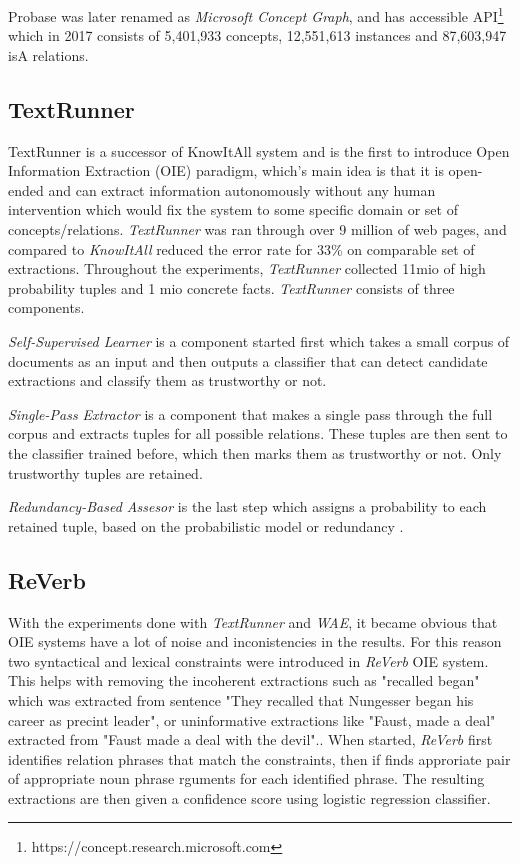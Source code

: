 Probase was later renamed as \emph{Microsoft Concept Graph}, and has accessible
API\footnote{https://concept.research.microsoft.com} which in 2017 consists of
5,401,933 concepts, 12,551,613 instances and 87,603,947 isA relations. 

\subsection {TextRunner}
\label{section:rw_TextRunner}
TextRunner is a successor of KnowItAll system \parencite{Soderland2007} and is
the first to introduce Open Information Extraction (OIE) paradigm, which's main
idea is that it is open-ended and can extract information autonomously without
any human intervention which would fix the system to some specific domain or set
of concepts/relations.
\emph{TextRunner} was ran through over 9 million of web pages, and compared to
\emph{KnowItAll} reduced the error rate for 33\% on comparable set of 
extractions. Throughout the experiments, \emph{TextRunner} collected 11mio
of high probability tuples and 1 mio concrete facts. \emph{TextRunner} consists
of three components.

\emph{Self-Supervised Learner} is a component started first which takes a small
corpus of documents as an input and then outputs a classifier that can detect
candidate extractions and classify them as trustworthy or not.

\emph{Single-Pass Extractor} is a component that makes a single pass through
the full corpus and extracts tuples for all possible relations. These tuples
are then sent to the classifier trained before, which then marks them as
trustworthy or not. Only trustworthy tuples are retained.

\emph{Redundancy-Based Assesor} is the last step which assigns a probability to
each retained tuple, based on the probabilistic model or redundancy
\parencite{Downey2005}.

\subsection{ReVerb}
\label{section:rw_ReVerb}
With  the experiments done with \emph{TextRunner} and \emph{WAE}, it became
obvious that OIE systems have a lot of noise and inconistencies in the results.
For this reason two syntactical and lexical constraints were introduced in
\emph{ReVerb} OIE system\parencite{Fader2011}. This helps with removing
the incoherent extractions such as "recalled began" which was extracted from
sentence "They recalled that Nungesser began his career as precint leader", or
uninformative extractions like "Faust, made a deal" extracted from "Faust
made a deal with the devil".\parencite{Fader2011}.
When started, \emph{ReVerb} first identifies relation phrases that match the
constraints, then if finds approriate pair of appropriate noun phrase rguments
for each identified phrase. The resulting extractions are then given a 
confidence score using logistic regression classifier.

